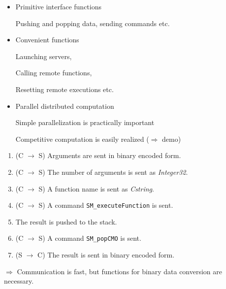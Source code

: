 \documentclass{slides}
\begin{document}
\begin{slide}{}

\begin{itemize}
\item Primitive interface functions

Pushing and popping data, sending commands etc.

\item Convenient functions

Launching servers,

Calling remote functions,

Resetting remote executions etc.

\item Parallel distributed computation

Simple parallelization is practically important

Competitive computation is easily realized ($\Rightarrow$ demo)
\end{itemize}
\end{slide}

\begin{slide}{}

\begin{enumerate}
\item (C $\rightarrow$ S) Arguments are sent in binary encoded form.
\item (C $\rightarrow$ S) The number of arguments is sent as {\sl Integer32}.
\item (C $\rightarrow$ S) A function name is sent as {\sl Cstring}.
\item (C $\rightarrow$ S) A command {\tt SM\_executeFunction} is sent.
\item The result is pushed to the stack.
\item (C $\rightarrow$ S) A command {\tt SM\_popCMO} is sent.
\item (S $\rightarrow$ C) The result is sent in binary encoded form.
\end{enumerate}

$\Rightarrow$ Communication is fast, but functions for binary data
conversion are necessary.
\end{slide}
\end{document}
